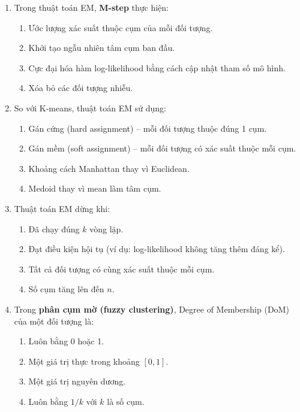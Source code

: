 \documentclass[10pt]{article}
\begin{document}
\begin{enumerate}[leftmargin=*, label=\textbf{Câu \arabic*.}]
    \item Trong thuật toán EM, \textbf{M-step} thực hiện:
    \begin{enumerate}[label=\Alph*.]
        \item Ước lượng xác suất thuộc cụm của mỗi đối tượng.
        \item Khởi tạo ngẫu nhiên tâm cụm ban đầu.
        \item Cực đại hóa hàm log-likelihood bằng cách cập nhật tham số mô hình.
        \item Xóa bỏ các đối tượng nhiễu.
    \end{enumerate}

    \item So với K-means, thuật toán EM sử dụng:
    \begin{enumerate}[label=\Alph*.]
        \item Gán cứng (hard assignment) -- mỗi đối tượng thuộc đúng 1 cụm.
        \item Gán mềm (soft assignment) -- mỗi đối tượng có xác suất thuộc mỗi cụm.
        \item Khoảng cách Manhattan thay vì Euclidean.
        \item Medoid thay vì mean làm tâm cụm.
    \end{enumerate}

    \item Thuật toán EM dừng khi:
    \begin{enumerate}[label=\Alph*.]
        \item Đã chạy đúng $k$ vòng lặp.
        \item Đạt điều kiện hội tụ (ví dụ: log-likelihood không tăng thêm đáng kể).
        \item Tất cả đối tượng có cùng xác suất thuộc mỗi cụm.
        \item Số cụm tăng lên đến $n$.
    \end{enumerate}

    \item Trong \textbf{phân cụm mờ (fuzzy clustering)}, Degree of Membership (DoM) của một đối tượng là:
    \begin{enumerate}[label=\Alph*.]
        \item Luôn bằng 0 hoặc 1.
        \item Một giá trị thực trong khoảng $[0, 1]$.
        \item Một giá trị nguyên dương.
        \item Luôn bằng $1/k$ với $k$ là số cụm.
    \end{enumerate}


\end{enumerate}
\end{document}
